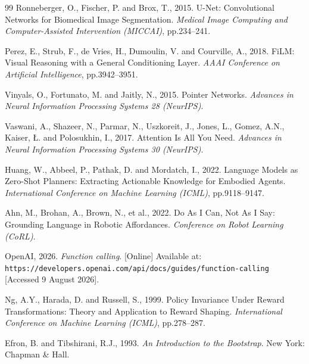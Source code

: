 \begin{thebibliography}{99}
Ronneberger, O., Fischer, P. and Brox, T., 2015.
U-Net: Convolutional Networks for Biomedical Image Segmentation.
\textit{Medical Image Computing and Computer-Assisted Intervention (MICCAI)},
pp.234--241.

Perez, E., Strub, F., de Vries, H., Dumoulin, V. and Courville, A., 2018.
FiLM: Visual Reasoning with a General Conditioning Layer.
\textit{AAAI Conference on Artificial Intelligence}, pp.3942--3951.

Vinyals, O., Fortunato, M. and Jaitly, N., 2015.
Pointer Networks.
\textit{Advances in Neural Information Processing Systems 28 (NeurIPS)}.

Vaswani, A., Shazeer, N., Parmar, N., Uszkoreit, J., Jones, L., Gomez, A.N.,
Kaiser, {\L}. and Polosukhin, I., 2017.
Attention Is All You Need.
\textit{Advances in Neural Information Processing Systems 30 (NeurIPS)}.

Huang, W., Abbeel, P., Pathak, D. and Mordatch, I., 2022.
Language Models as Zero-Shot Planners: Extracting Actionable Knowledge for
Embodied Agents.
\textit{International Conference on Machine Learning (ICML)}, pp.9118--9147.

Ahn, M., Brohan, A., Brown, N., et al., 2022.
Do As I Can, Not As I Say: Grounding Language in Robotic Affordances.
\textit{Conference on Robot Learning (CoRL)}.

OpenAI, 2026. \textit{Function calling}. [Online]
Available at: \texttt{https://developers.openai.com/api/docs/guides/function-calling}
[Accessed 9 August 2026].

Ng, A.Y., Harada, D. and Russell, S., 1999.
Policy Invariance Under Reward Transformations: Theory and Application to
Reward Shaping.
\textit{International Conference on Machine Learning (ICML)}, pp.278--287.

Efron, B. and Tibshirani, R.J., 1993.
\textit{An Introduction to the Bootstrap}. New York: Chapman \& Hall.

\end{thebibliography}
